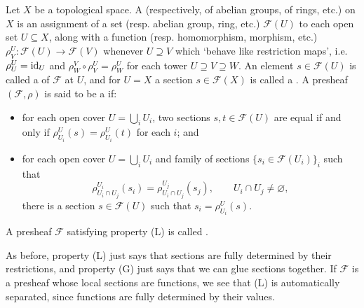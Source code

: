 \begin{defn}
	Let $X$ be a topological space. A  (respectively, of abelian groups, of rings, etc.) on $X$ is an assignment of a set (resp. abelian group, ring, etc.) $\mathcal{F}(U)$ to each open set $U \subseteq X$, along with a function (resp. homomorphism, morphism, etc.) $\rho^U_V : \mathcal{F}(U) \to \mathcal{F}(V)$ whenever $U \supseteq V$ which `behave like restriction maps', i.e. $\rho^U_U = \mathrm{id}_U$ and $\rho^V_W \circ \rho^U_V = \rho^U_W$ for each tower $U \supseteq V \supseteq W$. An element $s \in \mathcal{F}(U)$ is called a  of $\mathcal{F}$ at $U$, and for $U=X$ a section $s \in \mathcal{F}(X)$ is called a . A presheaf $(\mathcal{F}, \rho)$ is said to be a  if:
	\begin{itemize}
		\item[(L)] for each open cover $U = \bigcup_i U_i$, two sections $s,t \in \mathcal{F}(U)$ are equal if and only if $\rho^U_{U_i}(s) = \rho^U_{U_i}(t)$ for each $i$; and
		\item[(G)] for each open cover $U = \bigcup_i U_i$ and family of sections $\{s_i \in \mathcal{F}(U_i)\}_i$ such that
			\[
				\rho^{U_i}_{U_i \cap U_j}(s_i) = \rho^{U_j}_{U_i \cap U_j}(s_j), \qquad U_i \cap U_j \neq \varnothing,
			\]
			there is a section $s \in \mathcal{F}(U)$ such that $s_i = \rho^U_{U_i}(s)$.
	\end{itemize}
	A presheaf $\mathcal{F}$ satisfying property (L) is called .
\end{defn}

As before, property (L) just says that sections are fully determined by their restrictions, and property (G) just says that we can glue sections together. If $\mathcal{F}$ is a presheaf whose local sections are functions, we see that (L) is automatically separated, since functions are fully determined by their values.

